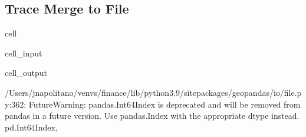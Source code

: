 \documentclass[letterpaper,10pt,english]{jupyterBook}
\begin{document}
\subsection{Trace Merge to File}
\label{\detokenize{notebooks/geo_coding:trace-merge-to-file}}
\begin{sphinxuseclass}{cell}\begin{sphinxVerbatimInput}

\begin{sphinxuseclass}{cell_input}
\begin{sphinxVerbatim}[commandchars=\\\{\}]
  
 
\end{sphinxVerbatim}

\end{sphinxuseclass}\end{sphinxVerbatimInput}
\begin{sphinxVerbatimOutput}

\begin{sphinxuseclass}{cell_output}
\begin{sphinxVerbatim}[commandchars=\\\{\}]
/Users/jnapolitano/venvs/finance/lib/python3.9/site\PYGZhy{}packages/geopandas/io/file.py:362: FutureWarning: pandas.Int64Index is deprecated and will be removed from pandas in a future version. Use pandas.Index with the appropriate dtype instead.
  pd.Int64Index,
\end{sphinxVerbatim}

\end{sphinxuseclass}\end{sphinxVerbatimOutput}

\end{sphinxuseclass}
\end{document}
